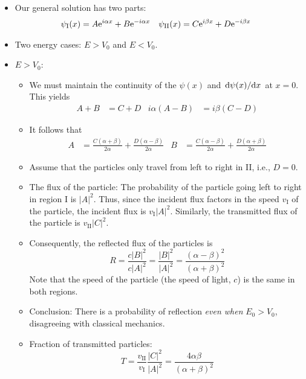 \documentclass[../notes.tex]{subfiles}
\begin{document}
\begin{itemize}
\begin{itemize}
        \item Our general solution has two parts:
        \begin{align*}
            \psi_\text{I}(x)  &= A\e[i\alpha x]+B\e[-i\alpha x]&
            \psi_\text{II}(x) &= C\e[i\beta x]+D\e[-i\beta x]
        \end{align*}
        \item Two energy cases: $E>V_0$ and $E<V_0$.
        \item $E>V_0$:
        \begin{itemize}
            \item We must maintain the continuity of the $\psi(x)$ and $\dv*{\psi(x)}{x}$ at $x=0$. This yields
            \begin{align*}
                A+B &= C+D&
                i\alpha(A-B) &= i\beta(C-D)
            \end{align*}
            \item It follows that
            \begin{align*}
                A &= \frac{C(\alpha+\beta)}{2\alpha}+\frac{D(\alpha-\beta)}{2\alpha}&
                B &= \frac{C(\alpha-\beta)}{2\alpha}+\frac{D(\alpha+\beta)}{2\alpha}
            \end{align*}
            \item Assume that the particles only travel from left to right in II, i.e., $D=0$.
            \item The flux of the particle: The probability of the particle going left to right in region I is $|A|^2$. Thus, since the incident flux factors in the speed $v_\text{I}$ of the particle, the incident flux is $v_\text{I}|A|^2$. Similarly, the transmitted flux of the particle is $v_\text{II}|C|^2$.
            \item Consequently, the reflected flux of the particles is
            \begin{equation*}
                R = \frac{c|B|^2}{c|A|^2} = \frac{|B|^2}{|A|^2} = \frac{(\alpha-\beta)^2}{(\alpha+\beta)^2}
            \end{equation*}
            Note that the speed of the particle (the speed of light, $c$) is the same in both regions.
            \item Conclusion: There is a probability of reflection \emph{even when} $E_0>V_0$, disagreeing with classical mechanics.
            \item Fraction of transmitted particles:
            \begin{equation*}
                T = \frac{v_\text{II}}{v_\text{I}}\frac{|C|^2}{|A|^2} = \frac{4\alpha\beta}{(\alpha+\beta)^2}

\end{equation*}
\end{itemize}
\end{itemize}
\end{itemize}
\end{document}
